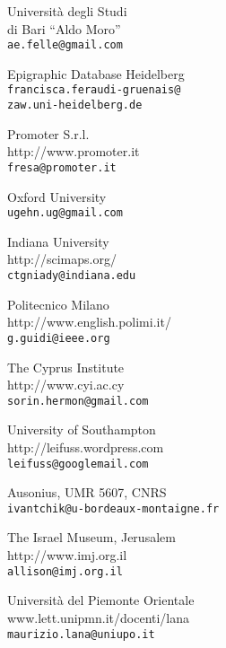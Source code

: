 \begin{contributors}
	
{  Università degli Studi\\ di Bari ``Aldo Moro'' \\
\texttt{ae.felle@gmail.com}
}


{ Epigraphic Database Heidelberg	  \\
\texttt{francisca.feraudi-gruenais@\\zaw.uni-heidelberg.de	}
}
		

{  	Promoter S.r.l. \\
{http://www.promoter.it} \\
\texttt{fresa@promoter.it}
}


{ Oxford University	  \\
\texttt{ugehn.ug@gmail.com}
}
	

{ Indiana University  \\
{	http://scimaps.org/}	\\
\texttt{ctgniady@indiana.edu}
}
	


{  Politecnico Milano \\
{http://www.english.polimi.it/ }\\
\texttt{g.guidi@ieee.org}
}

{  The Cyprus Institute	 \\
{http://www.cyi.ac.cy} \\
\texttt{sorin.hermon@gmail.com}
}

	

{  University of Southampton	 \\
{http://leifuss.wordpress.com} \\
\texttt{leifuss@googlemail.com	}
}

{  Ausonius, UMR 5607, CNRS	 \\
\texttt{ivantchik@u-bordeaux-montaigne.fr}
}

	
	
{ The Israel Museum, Jerusalem	  \\
{http://www.imj.org.il} \\
\texttt{allison@imj.org.il}
}
			
			
{  Università del Piemonte Orientale	 \\
{www.lett.unipmn.it/docenti/lana}	 \\
\texttt{maurizio.lana@uniupo.it}
}
			

\end{contributors}
